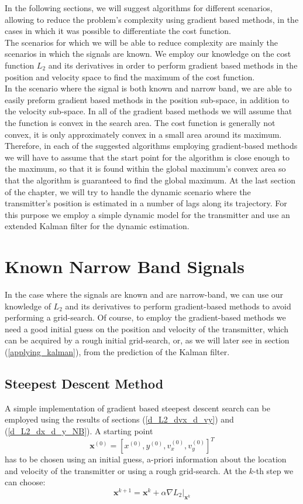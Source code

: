 In the following sections, we will suggest algorithms for
different scenarios, allowing to reduce the problem's complexity using gradient based methods, in the cases
in which it was possible to differentiate the cost function.\\
The scenarios for which we will be able to reduce complexity are mainly the scenarios in which
the signals are known. We employ our knowledge on the cost function $L_2$ and its
derivatives in order to perform gradient based methods in the position and velocity space to find the maximum of the cost function.\\
In the scenario where the signal is both known and narrow band, we are able to easily preform gradient based
methods in the position sub-space, in addition to the velocity sub-space.
In all of the gradient based methods we will assume that the function is convex in the search area.
The cost function is generally not convex, it is only approximately convex in a small area around its maximum.\\
Therefore, in each of the suggested algorithms employing gradient-based methods we will have to assume that
the start point for the algorithm is close enough to the maximum, so that it is found within the global maximum's convex area so that the algorithm is guaranteed to find the global maximum.
At the last section of the chapter, we will try to handle the dynamic scenario where the transmitter's
position is estimated in a number of lags along its trajectory. For this purpose we employ a simple
dynamic model for the transmitter and use an extended Kalman filter for the dynamic estimation.

\section{Known Narrow Band Signals}
In the case where the signals are known and are narrow-band, we can use our knowledge of
$L_2$ and its derivatives to perform gradient-based methods to avoid performing a grid-search.
Of course, to employ the gradient-based methods we need a good initial guess on the position and
velocity of the transmitter, which can be acquired by a rough initial grid-search, or, as we will later see
in section (\ref{applying_kalman}), from the prediction of the Kalman filter.\\

\subsection{Steepest Descent Method}
A simple implementation of gradient based steepest descent search can be employed using the results of sections  (\ref{d_L2_dvx_d_vy}) and (\ref{d_L2_dx_d_y_NB}). 
A starting point $$\mathbf{x}^{(0)}=[x^{(0)}, y^{(0)}, v_x^{(0)}, v_y^{(0)}]^T$$ has to be chosen using an initial guess, a-priori information about the location and velocity of the transmitter or using a rough grid-search.
At the $k$-th step we can choose: 
\begin{equation}
\mathbf{x}^{k+1}=\mathbf{x}^{k}+\alpha \nabla L_2 |_{\mathbf{x}^k}
\end{equation}

